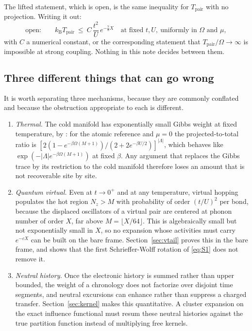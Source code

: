 \documentclass[11pt]{article}
\theoremstyle{definition}
\theoremstyle{remark}
\newcommand{\Tpair}{T_{\mathrm{pair}}}
\begin{document}
The lifted statement, which is open, is the same inequality for $\Tpair$ with no
projection. Writing it out:
\begin{equation}
\text{open:}\qquad k_{\mathrm{B}}\Tpair\ \le\ C\,\frac{t^{2}}{U}\,
e^{-\frac78 X}\quad\text{at fixed }t,U,\ \text{uniformly in }\Omega
\text{ and }\mu,
\label{eq:lift}
\end{equation}
with $C$ a numerical constant, or the corresponding statement that
$\Tpair/\Omega\to\infty$ is impossible at strong coupling. Nothing in this note
decides between them.

\subsection{Three different things that can go wrong}

It is worth separating three mechanisms, because they are commonly conflated and
because the obstruction appropriate to each is different.

\begin{enumerate}[label=(\roman*),leftmargin=2.2em]
\item \emph{Thermal.} The cold manifold has exponentially small Gibbs weight at
fixed temperature, by \cite[Prop.~3]{largeu}: for the atomic reference and
$\mu=0$ the projected-to-total ratio is
$[2(1-e^{-\beta\Omega(M+1)})/(2+2e^{-\beta U/2})]^{|\Lambda|}$, which behaves like
$\exp(-|\Lambda|e^{-\beta\Omega(M+1)})$ at fixed $\beta$. Any argument that
replaces the Gibbs trace by its restriction to the cold manifold therefore loses
an amount that is not recoverable site by site.
\item \emph{Quantum virtual.} Even at $t\to0^{+}$ and at any temperature, virtual
hopping populates the hot region $N_{z}>M$ with probability of order $(t/U)^{2}$
per bond, because the displaced oscillators of a virtual pair are centered at
phonon number of order $X$, far above $M=\lfloor X/64\rfloor$. This is
algebraically small but not exponentially small in $X$, so no expansion whose
activities must carry $e^{-cX}$ can be built on the bare frame.
Section~\ref{sec:vtail} proves this in the bare frame, and shows that the first
Schrieffer-Wolff rotation of \eqref{eq:S1} does not remove it.
\item \emph{Neutral history.} Once the electronic history is summed rather than
upper bounded, the weight of a chronology does not factorize over disjoint time
segments, and neutral excursions can enhance rather than suppress a charged
transfer. Section~\ref{sec:kernel} makes this quantitative. A cluster expansion
on the exact influence functional must resum these neutral histories against the
true partition function instead of multiplying free kernels.
\end{enumerate}
\end{document}
